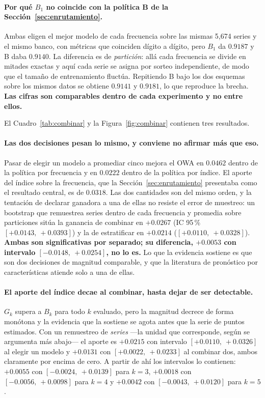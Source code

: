 \paragraph{Por qué $B_1$ no coincide con la política B de la
Sección~\ref{sec:enrutamiento}.} Ambas eligen el mejor modelo de cada frecuencia sobre las
mismas 5{,}674 series y el mismo banco, con métricas que coinciden dígito a dígito, pero
$B_1$ da $0.9187$ y B daba $0.9140$. La diferencia es de \emph{partición}: allá cada
frecuencia se divide en mitades exactas y aquí cada serie se asigna por sorteo
independiente, de modo que el tamaño de entrenamiento fluctúa. Repitiendo B bajo los dos
esquemas sobre los mismos datos se obtiene $0.9141$ y $0.9181$, lo que reproduce la
brecha. \textbf{Las cifras son comparables dentro de cada experimento y no entre ellos.}

El Cuadro~\ref{tab:combinar} y la Figura~\ref{fig:combinar} contienen tres resultados.

\paragraph{Las dos decisiones pesan lo mismo, y conviene no afirmar más que eso.} Pasar
de elegir un modelo a promediar cinco mejora el OWA en $0.0462$ dentro de la política por
frecuencia y en $0.0222$ dentro de la política por índice. El aporte del índice sobre la
frecuencia, que la Sección~\ref{sec:enrutamiento} presentaba como el resultado central,
es de $0.0318$. Las dos cantidades son del mismo orden, y la tentación de declarar
ganadora a una de ellas no resiste el error de muestreo: un bootstrap que remuestrea
series dentro de cada frecuencia y promedia sobre particiones sitúa la ganancia de
combinar en $+0.0267$ (IC 95\,\% $[+0.0143,\ +0.0393]$) y la de estratificar en
$+0.0214$ ($[+0.0110,\ +0.0328]$). \textbf{Ambas son significativas por separado; su
diferencia, $+0.0053$ con intervalo $[-0.0148,\ +0.0254]$, no lo es.} Lo que la evidencia
sostiene es que son dos decisiones de magnitud comparable, y que la literatura de
pronóstico por características atiende solo a una de ellas.

\paragraph{El aporte del índice decae al combinar, hasta dejar de ser detectable.}
$G_k$ supera a $B_k$ para todo $k$ evaluado, pero la magnitud decrece de forma monótona y
la evidencia que la sostiene se agota antes que la serie de puntos estimados. Con un
remuestreo de \emph{series} ---la unidad que corresponde, según se argumenta más abajo---
el aporte es $+0.0215$ con intervalo $[+0.0110,\ +0.0326]$ al elegir un modelo y
$+0.0131$ con $[+0.0022,\ +0.0233]$ al combinar dos, ambos claramente por encima de cero.
A partir de ahí los intervalos lo contienen: $+0.0055$ con $[-0.0024,\ +0.0139]$ para
$k=3$, $+0.0018$ con $[-0.0056,\ +0.0098]$ para $k=4$ y $+0.0042$ con
$[-0.0043,\ +0.0120]$ para $k=5$.


